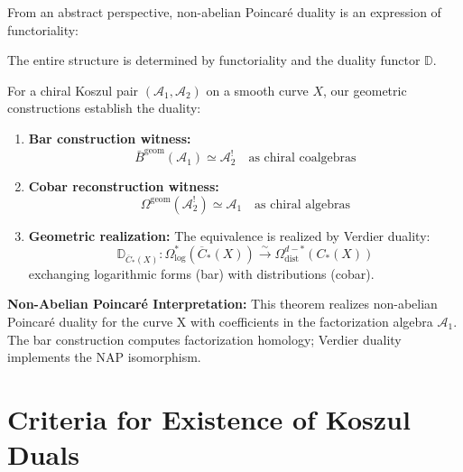 \begin{insight}\label{insight:grothendieck-NAP}
From an abstract perspective, non-abelian Poincaré duality is an expression of functoriality:

\begin{center}
\end{center}

The entire structure is determined by functoriality and the duality functor $\mathbb{D}$.
\end{insight}

\begin{theorem}\label{thm:geometric-bar-cobar}
For a chiral Koszul pair $(\mathcal{A}_1, \mathcal{A}_2)$ on a smooth curve $X$, our geometric constructions establish the duality:
\begin{enumerate}
\item \textbf{Bar construction witness:}
$$\bar{B}^{\text{geom}}(\mathcal{A}_1) \simeq \mathcal{A}_2^! \quad \text{as chiral coalgebras}$$

\item \textbf{Cobar reconstruction witness:}
$$\Omega^{\text{geom}}(\mathcal{A}_2^!) \simeq \mathcal{A}_1 \quad \text{as chiral algebras}$$

\item \textbf{Geometric realization:} The equivalence is realized by Verdier duality:
$$\mathbb{D}_{\overline{C}_*(X)}: \Omega^*_{\log}(\overline{C}_*(X)) \xrightarrow{\sim} \Omega^{d-*}_{\text{dist}}(C_*(X))$$
exchanging logarithmic forms (bar) with distributions (cobar).
\end{enumerate}

\textbf{Non-Abelian Poincaré Interpretation:}
This theorem realizes non-abelian Poincaré duality for the curve X with coefficients in the factorization algebra $\mathcal{A}_1$. The bar construction computes factorization homology; Verdier duality implements the NAP isomorphism.
\end{theorem}

\section{Criteria for Existence of Koszul Duals}

